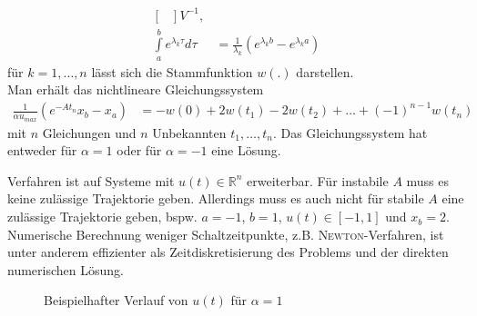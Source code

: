 \begin{exmp}
\begin{align*}
\begin{bmatrix}
	\end{bmatrix}V^{-1},\\
	\int\limits_a^b e^{\lambda_k \tau}d\tau & = \frac{1}{\lambda_k}\left(e^{\lambda_k b}-e^{\lambda_k a} \right)
\end{align*}
für $k=1,\ldots,n$ lässt sich die Stammfunktion $w(.)$ darstellen.\\
Man erhält das nichtlineare Gleichungssystem
\begin{align*}
	\frac{1}{\alpha u_{max}}\left(e^{-At_n}x_b-x_a \right) & = -w(0) + 2 w(t_1) - 2 w(t_2) + \ldots +(-1)^{n-1}w(t_n)
\end{align*}
mit $n$ Gleichungen und $n$ Unbekannten $t_1,\ldots,t_n$. Das Gleichungssystem hat entweder für $\alpha = 1$ oder für $\alpha = -1$ eine Lösung.
\begin{remark}
Verfahren ist auf Systeme mit $u(t)\in\mathbb{R}^n$ erweiterbar. Für instabile $A$ muss es keine zulässige Trajektorie geben. Allerdings muss es auch
nicht für stabile $A$ eine zulässige Trajektorie geben, bspw. $a=-1$, $b=1$, $u(t)\in[-1,1]$ und $x_b=2$.\\
Numerische Berechnung weniger Schaltzeitpunkte, z.B. \textsc{Newton}-Verfahren, ist unter anderem effizienter als Zeitdiskretisierung des Problems und
der direkten numerischen Lösung.
\end{remark}
\begin{figure}[htb]
	\centering
	
	\caption{Beispielhafter Verlauf von $u(t)$ für $\alpha=1$}
	\label{fig:kap_2_bsp_2_zustands_u_pont}
\end{figure}
\end{exmp}
